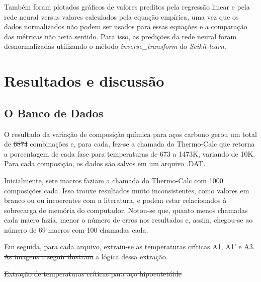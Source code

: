 \documentclass[brazil,tf,epusp]{usp}  %
\providecommand{\DIFadd}[1]{{\protect\color{blue}\uwave{#1}}} %
\providecommand{\DIFdel}[1]{{\protect\color{red}\sout{#1}}}                      %
\providecommand{\DIFaddbegin}{} %
\providecommand{\DIFaddend}{} %
\providecommand{\DIFdelbegin}{} %
\providecommand{\DIFdelend}{} %
\providecommand{\DIFdelFL}[1]{\DIFdel{#1}} %
\begin{document}
Também foram plotados gráficos de valores preditos pela regressão linear e pela rede neural versus valores calculados pela equação empírica, uma vez que os dados normalizados não podem ser usados para essas equações e a comparação das métricas não teria sentido. Para isso, as predições da rede neural foram desnormalizadas utilizando o método \textit{inverse\_transform} do \textit{Scikit-learn}.


\chapter{Resultados e discussão}
\DIFaddbegin 

\DIFaddend \section{O Banco de Dados}
\DIFaddbegin 

\DIFaddend O resultado da variação de composição química para aços carbono gerou um total de \DIFdelbegin \DIFdel{6874 }\DIFdelend \DIFaddbegin \DIFadd{6875 }\DIFaddend combinações e, para cada, fez-se a chamada do Thermo-Calc\textregistered{} que retorna a porcentagem de cada fase para temperaturas de 673 a 1473K, variando de 10K. Para cada composição, os dados são salvos em um arquivo .DAT.

Inicialmente, sete macros faziam a chamada do Thermo-Calc\textregistered{} com 1000 composições cada. Isso trouxe resultados muito inconsistentes, como valores em branco ou ou incoerentes com a literatura, e podem estar relacionados à sobrecarga de memória do computador. Notou-se que, quanto menos chamadas cada macro fazia, menor o número de erros nos resultados e, assim, chegou-se ao número de 69 macros com 100 chamadas cada.

Em seguida, para cada arquivo, extraiu-se as temperaturas críticas A1, A1' e A3. \DIFdelbegin \DIFdel{As imagens a seguir ilustram }\DIFdelend \DIFaddbegin \DIFadd{A Figura \ref{fig:Tcrit_exemplos} ilustra }\DIFaddend a lógica dessa extração. \DIFdelbegin %

{%
\DIFdelFL{Extração de temperaturas críticas para aço hipoeutetóide}}
\end{document}
